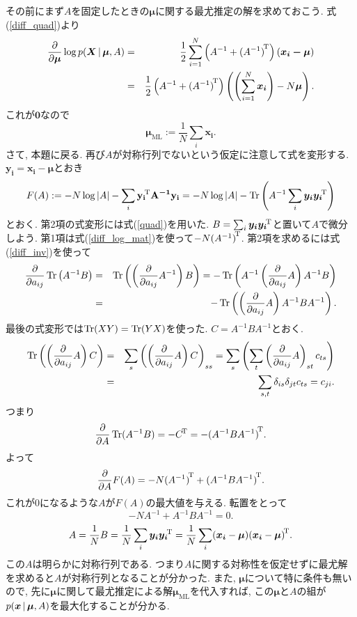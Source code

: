 その前にまず$A$を固定したときの$\bm{\mu}$に関する最尤推定の解を求めておこう.
式(\ref{diff_quad})より
\begin{eqnarray*}
\dif{\bm{\mu}} \log \fnvPair p(\bm{X}|\bm{\mu}, A)
&=&\half\sum_{i=1}^N\left(A^{-1}+\trans{(A^{-1})}\right)(\bm{x_i-\mu})\\
&=&\half\left(A^{-1}+\trans{(A^{-1})}\right)\left(\left(\sum_{i=1}^N \bm{x_i}\right) - N\bm{\mu}\right).
\end{eqnarray*}
これが$\bm{0}$なので
$$
\bm{\mu}_{\text{ML}}:=\frac{1}{N}\sum_i \bm{x_i}.
$$
さて, 本題に戻る. 再び$A$が対称行列でないという仮定に注意して式を変形する.
$\bm{y_i}=\bm{x_i}-\bm{\mu}$とおき
$$
F(A):=-N\log|A|-\sum_i {\mathbf{\boldsymbol{y_i}}}^{\!\mathrm{T}} \mathbf{\boldsymbol{A^{-1}}} \mathbf{\boldsymbol{y_i}}
=-N\log|A|-\mathop{\mathrm{Tr}}\nolimits\left(A^{-1}\sum_i \bm{y_i}{\bm{y_i}}^{\!\mathrm{T}}\right)
$$
とおく.
第2項の式変形には式(\ref{quad})を用いた.
$B=\sum_i \bm{y_i}{\bm{y_i}}^{\!\mathrm{T}}$と置いて$A$で微分しよう.
第1項は式(\ref{diff_log_mat})を使って$-N{{(A^{-1})}}^{\!\mathrm{T}}$.
第2項を求めるには式(\ref{diff_inv})を使って
\begin{eqnarray*}
\frac{\partial}{\partial a_{ij}}\mathop{\mathrm{Tr}}\nolimits\left(A^{-1}B\right)
 &=& \mathop{\mathrm{Tr}}\nolimits\left(\left(\frac{\partial}{\partial a_{ij}}A^{-1}\right)B\right)
 = -\mathop{\mathrm{Tr}}\nolimits\left(A^{-1}\left(\frac{\partial}{\partial a_{ij}}A\right)A^{-1}B\right)\\
&=&-\mathop{\mathrm{Tr}}\nolimits\left(\left(\frac{\partial}{\partial a_{ij}}A\right)A^{-1}BA^{-1}\right).
\end{eqnarray*}
最後の式変形では$\mathop{\mathrm{Tr}}\nolimits(XY)=\mathop{\mathrm{Tr}}\nolimits(YX)$を使った. $C=A^{-1}BA^{-1}$とおく.
\begin{eqnarray*}
\mathop{\mathrm{Tr}}\nolimits\left(\left(\frac{\partial}{\partial a_{ij}}A\right)C\right)
 &=& \sum_s \left(\left(\frac{\partial}{\partial a_{ij}}A\right)C\right)_{ss}
  = \sum_s \left(\sum_t \left(\frac{\partial}{\partial a_{ij}}A\right)_{st} c_{ts}\right)\\
 &=& \sum_{s,t} \delta_{is} \delta_{jt} c_{ts}=c_{ji}.
\end{eqnarray*}
つまり
\begin{eqnarray}\label{diff_tr_invA_B}
\frac{\partial}{\partial A}\mathop{\mathrm{Tr}}\nolimits(A^{-1}B)=-{C}^{\!\mathrm{T}}=-{(A^{-1}BA^{-1})}^{\!\mathrm{T}}.
\end{eqnarray}
よって
$$\frac{\partial}{\partial A}F(A)=-N{{(A^{-1})}}^{\!\mathrm{T}}+{(A^{-1}BA^{-1})}^{\!\mathrm{T}}.$$
これが$0$になるような$A$が$F(A)$の最大値を与える.
転置をとって
$$
-NA^{-1}+A^{-1}BA^{-1}=0.
$$
$$
A
 =\frac{1}{N}B
 =\frac{1}{N}\sum_i \bm{y_i}{\bm{y_i}}^{\!\mathrm{T}}
 =\frac{1}{N}\sum_i (\bm{x_i}-\bm{\mu}){(\bm{x_i}-\bm{\mu})}^{\!\mathrm{T}}.
$$
この$A$は明らかに対称行列である.
つまり$A$に関する対称性を仮定せずに最尤解を求めると$A$が対称行列となることが分かった.
また, $\bm{\mu}$について特に条件も無いので,
先に$\bm{\mu}$に関して最尤推定による解$\bm{\mu}_{\text{ML}}$を代入すれば,
この$\bm{\mu}$と$A$の組が$\fnvPair p(\bm x|\bm\mu, A)$を最大化することが分かる.
